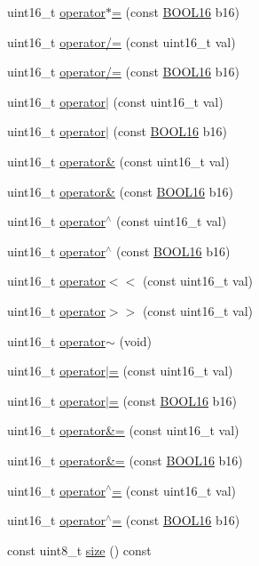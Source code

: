 \begin{DoxyCompactItemize}
uint16\+\_\+t \hyperlink{struct_b_o_o_l16_a12663cef2c489f2a4ac51c61f4bb229d}{operator$\ast$=} (const \hyperlink{struct_b_o_o_l16}{B\+O\+O\+L16} b16)
\item 
uint16\+\_\+t \hyperlink{struct_b_o_o_l16_a87fbb17dc443d61757966bbdb8ea171d}{operator/=} (const uint16\+\_\+t val)
\item 
uint16\+\_\+t \hyperlink{struct_b_o_o_l16_a79bcf50fe8c4adaeee2bcf3c20cdeb8a}{operator/=} (const \hyperlink{struct_b_o_o_l16}{B\+O\+O\+L16} b16)
\item 
uint16\+\_\+t \hyperlink{struct_b_o_o_l16_a8af17c671699145edb075ea420c4538b}{operator$\vert$} (const uint16\+\_\+t val)
\item 
uint16\+\_\+t \hyperlink{struct_b_o_o_l16_acda76a27eb6ea4e92acfb166cdf3f89b}{operator$\vert$} (const \hyperlink{struct_b_o_o_l16}{B\+O\+O\+L16} b16)
\item 
uint16\+\_\+t \hyperlink{struct_b_o_o_l16_ab71450de51237e350ba9be06cd3920e8}{operator\&} (const uint16\+\_\+t val)
\item 
uint16\+\_\+t \hyperlink{struct_b_o_o_l16_a06e9d0d0af8d087316055c5a1e46c7f1}{operator\&} (const \hyperlink{struct_b_o_o_l16}{B\+O\+O\+L16} b16)
\item 
uint16\+\_\+t \hyperlink{struct_b_o_o_l16_a7c6eec752dc57d5c27d8d5109bac10f7}{operator$^\wedge$} (const uint16\+\_\+t val)
\item 
uint16\+\_\+t \hyperlink{struct_b_o_o_l16_ae532dbe4dfd626485645e8514001b121}{operator$^\wedge$} (const \hyperlink{struct_b_o_o_l16}{B\+O\+O\+L16} b16)
\item 
uint16\+\_\+t \hyperlink{struct_b_o_o_l16_a229cb6ed9115f7908e779311c2f95b9c}{operator$<$$<$} (const uint16\+\_\+t val)
\item 
uint16\+\_\+t \hyperlink{struct_b_o_o_l16_a0d8f006fbd86c927238a4d1420c3c6a1}{operator$>$$>$} (const uint16\+\_\+t val)
\item 
uint16\+\_\+t \hyperlink{struct_b_o_o_l16_aaaacdec648453265e0f77458848bea53}{operator$\sim$} (void)
\item 
uint16\+\_\+t \hyperlink{struct_b_o_o_l16_a9178b1131b1e97f71d2554ac61fbd3c3}{operator$\vert$=} (const uint16\+\_\+t val)
\item 
uint16\+\_\+t \hyperlink{struct_b_o_o_l16_ae46b5a9f5d39a7e0fdca2c356228e94a}{operator$\vert$=} (const \hyperlink{struct_b_o_o_l16}{B\+O\+O\+L16} b16)
\item 
uint16\+\_\+t \hyperlink{struct_b_o_o_l16_aea3642667465bbc7f98cbc8317dd245c}{operator\&=} (const uint16\+\_\+t val)
\item 
uint16\+\_\+t \hyperlink{struct_b_o_o_l16_a7f993957f3bc3effad1a4bf4e63d5b0a}{operator\&=} (const \hyperlink{struct_b_o_o_l16}{B\+O\+O\+L16} b16)
\item 
uint16\+\_\+t \hyperlink{struct_b_o_o_l16_a69c5e6a6fb7e8651b24ff01caf070d21}{operator$^\wedge$=} (const uint16\+\_\+t val)
\item 
uint16\+\_\+t \hyperlink{struct_b_o_o_l16_af929bd77944f9877968203b9ddf3d110}{operator$^\wedge$=} (const \hyperlink{struct_b_o_o_l16}{B\+O\+O\+L16} b16)
\item 
const uint8\+\_\+t \hyperlink{struct_b_o_o_l16_af16f1167b6a21040e6a658b9e3bf58a8}{size} () const
\end{DoxyCompactItemize}
